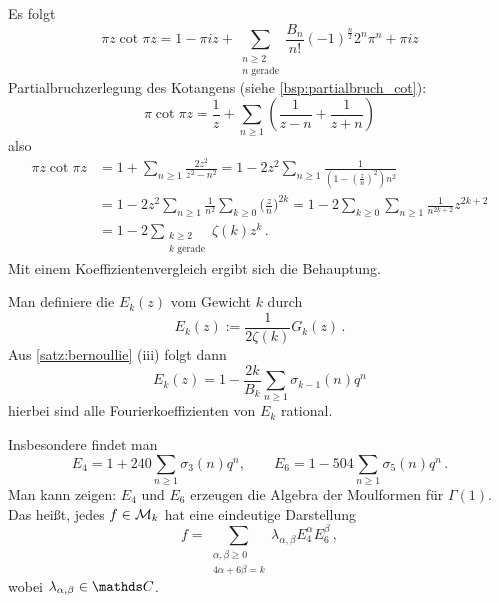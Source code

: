 \begin{bewe-list}
	Es folgt
	\[
	\pi z \cot \pi z = 1 - \pi iz + \sum_{\substack{n\geq 2\\ \scriptscriptstyle n \text{ gerade}}} \frac{B_n}{n!} (-1)^{\frac{n}{2}} 2^n \pi^n + \pi iz
	\]
	Partialbruchzerlegung des Kotangens (siehe \autoref{bsp:partialbruch_cot}):
	\[
	\pi \cot \pi z = \frac{1}{z} + \sum_{n\geq1} \left(\frac{1}{z-n} + \frac{1}{z+n}\right)
	\]
	also
	\begin{align*}
	\pi z \cot \pi z
	&= 1 + \sum_{n\geq1} \frac{2z^2}{z^2-n^2}
	= 1 - 2z^2\sum_{n\geq1} \frac{1}{(1-(\frac{z}{n})^2)n^2} \\ %
	&= 1 - 2z^2 \sum_{n\geq1} \frac{1}{n^2} \sum_{k \geq 0} \Big(\frac{z}{n}\Big)^{2k}
	= 1 - 2 \sum_{k \geq 0} \sum_{n \geq 1} \frac{1}{n^{2k+2}} z^{2k+2} \\
	&= 1 - 2\sum_{\substack{k\geq2\\ \scriptscriptstyle k \text{ gerade}}} \zeta(k)z^k
	\,.
	\end{align*}
	Mit einem Koeffizientenvergleich ergibt sich die Behauptung.
\end{bewe-list}

\begin{defi}
	Man definiere die  $E_k(z)$ vom Gewicht $k$ durch
	\[
	E_k(z) := \frac{1}{2\zeta(k)} G_k(z)
	\,.
	\]
	Aus \autoref{satz:bernoullie} (iii) folgt dann
	\[
	E_k(z) = 1 - \frac{2k}{B_k} \sum_{n\geq1} \sigma_{k-1}(n) q^n
	\]
	hierbei sind alle Fourierkoeffizienten von $E_k$ rational.
\end{defi}

Insbesondere findet man
\[
E_4 = 1 + 240 \sum_{n\geq 1} \sigma_3(n)q^n, \qquad
E_6 = 1 - 504 \sum_{n \geq 1} \sigma_5(n)q^n
\,.
\]
Man kann zeigen: $E_4$ und $E_6$ erzeugen die Algebra der Moulformen für $\Gamma(1)$.
Das heißt, jedes $f \in \mathcal{M}_k$ hat eine eindeutige Darstellung
\[
f = \sum_{\substack{\alpha, \beta \geq 0\\ \scriptscriptstyle 4\alpha + 6\beta = k}} \lambda_{\alpha, \beta} E_4^\alpha E_6^\beta
\,,
\]
wobei $\lambda_{\alpha, \beta} \in \CC$.